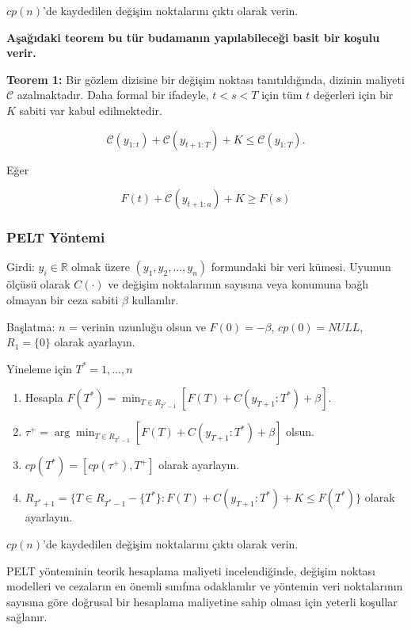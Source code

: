 \documentclass[12pt,twoside]{deuthesis}
\begin{document}
\(cp(n)\)'de kaydedilen değişim noktalarını çıktı olarak verin.

\textbf{Aşağıdaki teorem bu tür budamanın yapılabileceği basit bir koşulu verir.}

\textbf{Teorem 1:} Bir gözlem dizisine bir değişim noktası tanıtıldığında, dizinin maliyeti \(\mathcal{C}\) azalmaktadır. Daha formal bir ifadeyle, \(t < s < T\) için tüm \(t\) değerleri için bir \(K\) sabiti var kabul edilmektedir.

\[
\mathcal{C}(y_{1:t}) + \mathcal{C}(y_{t+1:T}) + K \leq \mathcal{C}(y_{1:T}).
\]

Eğer

\[
F(t) + \mathcal{C}(y_{t+1:a}) + K \geq F(s)
\]

\hypertarget{pelt-yuxf6ntemi}{%
\subsubsection{PELT Yöntemi}\label{pelt-yuxf6ntemi}}

Girdi: \(y_i \in \mathbb{R}\) olmak üzere \((y_1, y_2, \ldots, y_n)\) formundaki bir veri kümesi. Uyumun ölçüsü olarak \(C(\cdot)\) ve değişim noktalarının sayısına veya konumuna bağlı olmayan bir ceza sabiti \(\beta\) kullanılır.

Başlatma: \(n\) = verinin uzunluğu olsun ve \(F(0) = -\beta\), \(cp(0) = NULL\), \(R_1 = \{0\}\) olarak ayarlayın.

Yineleme için \(T^* = 1, \ldots, n\)

\begin{enumerate}
\def\labelenumi{\arabic{enumi}.}
\item
  Hesapla \(F(T^*) = \min_{T \in R_{T^*-1}} [F(T) + C(y_{T+1}:T^*) + \beta]\).
\item
  \(\tau^+ = \arg \min_{T \in R_{T^*-1}} [F(T) + C(y_{T+1}:T^*) + \beta]\) olsun.
\item
  \(cp(T^*) = [cp(\tau^+), T^+]\) olarak ayarlayın.
\item
  \(R_{T^*+1} = \{T \in R_{T^*-1} - \{T^*\} : F(T) + C(y_{T+1}:T^*) + K \leq F(T^*)\}\) olarak ayarlayın.
\end{enumerate}

\(cp(n)\)'de kaydedilen değişim noktalarını çıktı olarak verin.

PELT yönteminin teorik hesaplama maliyeti incelendiğinde, değişim noktası modelleri ve cezaların en önemli sınıfına odaklanılır ve yöntemin veri noktalarının sayısına göre doğrusal bir hesaplama maliyetine sahip olması için yeterli koşullar sağlanır.
\end{document}
